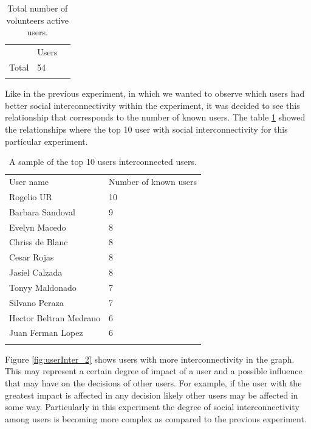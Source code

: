 \begin{table}
\small
\caption{Total number of volunteers active users.}
\label{tab:totalUsers_1}
\centering
\small
\begin{tabular}{p{3cm} p{3cm} p{3cm} }
\hline\noalign{\smallskip}
  & Users &  \\
\noalign{\smallskip}\hline\noalign{\smallskip}
\small{Total } & \small{54} & \\ \hline
\noalign{\smallskip}\hline
\end{tabular}
\end{table}

Like in the previous experiment, in which we wanted to observe which users
had better social
interconnectivity within the experiment, it was decided to see this
relationship that corresponds to the number of known users. The table \ref{tab:totalUsers_1}
showed the relationships where the top 10 user  with social
interconnectivity for this particular experiment.


\begin{table}
\small
\caption{A sample of the top 10 users interconnected users.}
\label{tab:knownUsers_2}
\centering
\small
\begin{tabular}{p{3cm} p{3cm}  }
\hline\noalign{\smallskip}
 User name & Number of known users \\
\noalign{\smallskip}\hline\noalign{\smallskip}
\small{Rogelio UR} & \small{10}  \\ \hline
\small{Barbara Sandoval} & \small{9}  \\ \hline
\small{Evelyn Macedo} & \small{8}  \\ \hline
\small{Chriss de Blanc} & \small{8}  \\ \hline
\small{Cesar Rojas} & \small{8}  \\ \hline
\small{Jasiel Calzada} & \small{8}  \\ \hline
\small{Tonyy Maldonado} & \small{7}  \\ \hline
\small{Silvano Peraza} & \small{7}  \\ \hline
\small{Hector Beltran Medrano} & \small{6}  \\ \hline
\small{Juan Ferman Lopez} & \small{6}  \\ \hline
\noalign{\smallskip}\hline
\end{tabular}
\end{table}

Figure \ref{fig:userInter_2} shows users with more interconnectivity in the
graph. This may represent a certain degree of impact of a user and a possible influence
that may have on the decisions of other users. For example, if the
user with the greatest impact is affected in any decision likely other users may
be affected in some way. Particularly in this experiment the degree of social
interconnectivity among users is becoming more complex as compared to the
previous experiment.

